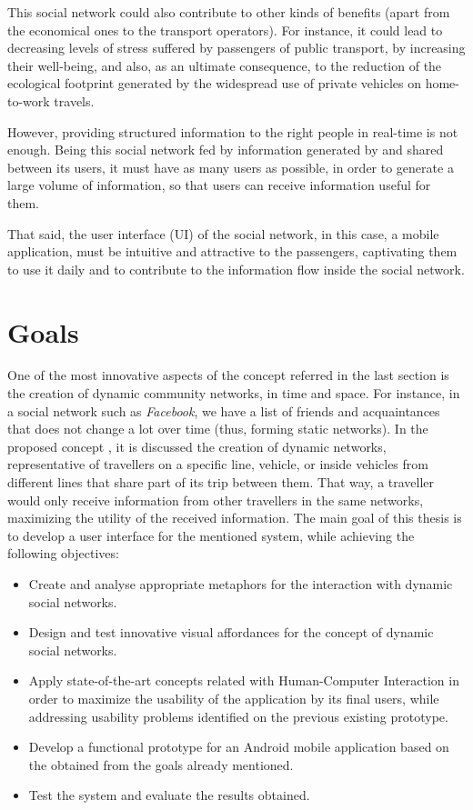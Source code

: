 This social network could also contribute to other kinds of benefits (apart from the economical ones to the transport operators\cite{kn:NGeC14}). For instance, it could lead to decreasing levels of stress suffered by passengers of public transport, by increasing their well-being, and also, as an ultimate consequence, to the reduction of the ecological footprint generated by the widespread use of private vehicles on home-to-work travels.

However, providing structured information to the right people in real-time is not enough. Being this social network fed by information generated by and shared between its users, it must have as many users as possible, in order to generate a large volume of information, so that users can receive information useful for them.

That said, the user interface (UI) of the social network, in this case, a mobile application, must be intuitive and attractive to the passengers, captivating them to use it daily and to contribute to the information flow inside the social network. 

\section{Goals} \label{sec:goals}

One of the most innovative aspects of the concept referred in the last section is the creation of dynamic community networks, in time and space. For instance, in a social network such as \emph{Facebook}, we have a list of friends and acquaintances that does not change a lot over time (thus, forming static networks). In the proposed concept \cite{kn:NGeCP11}, it is discussed the creation of dynamic networks, representative of travellers on a specific line, vehicle, or inside vehicles from different lines that share part of its trip between them. That way, a traveller would only receive information from other travellers in the same networks, maximizing the utility of the received information.
The main goal of this thesis is to develop a user interface for the mentioned system, while achieving the following objectives:

\begin{itemize}
\item Create and analyse appropriate metaphors for the interaction with dynamic social networks.
\item Design and test innovative visual affordances for the concept of dynamic social networks.
\item Apply state-of-the-art concepts related with Human-Computer Interaction in order to maximize the usability of the application by its final users, while addressing usability problems identified on the previous existing prototype.
\item Develop a functional prototype for an Android mobile application based on the obtained from the goals already mentioned.
\item Test the system and evaluate the results obtained.
\end{itemize}

